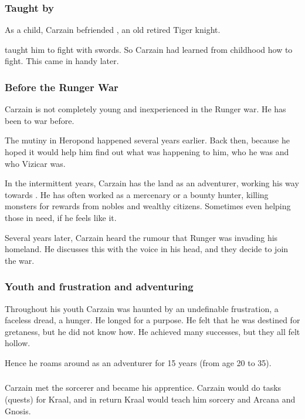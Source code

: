 \subsubsection[Taught by Weylon]{Taught by {\Weylon}}
As a child, Carzain befriended , an old retired Tiger knight. 

\Weylon{} taught him to fight with swords. 
So Carzain had learned from childhood how to fight. 
This came in handy later. 





\subsubsection{Before the Runger War}
Carzain is not completely young and inexperienced in the Runger war. 
He has been to war before. 

The mutiny in Heropond happened several years earlier. 
Back then,  because he hoped it would help him find out what was happening to him, who he was and who Vizicar was. 

In the intermittent years, Carzain has \travelled the land as an adventurer, working his way towards \kenosis. 
He has often worked as a mercenary or a bounty hunter, killing monsters for rewards from nobles and wealthy citizens. 
Sometimes even helping those in need, if he feels like it. 

Several years later, Carzain heard the rumour that Runger was invading his homeland. 
He discusses this with the voice in his head, and they decide to join the war. 





\subsubsection{Youth and frustration and adventuring}
Throughout his youth Carzain was haunted by an undefinable frustration, a faceless dread, a hunger. 
He longed for a purpose. 
He felt that he was destined for gretaness, but he did not know how.
He achieved many successes, but they all felt hollow. 

Hence he roams around as an adventurer for 15 years (from age 20 to 35). 





\subsubsection{\ZeethanKraal}
Carzain met the \caisith sorcerer  and became his apprentice.
Carzain would do tasks (quests) for Kraal, and in return Kraal would teach him sorcery and Arcana and Gnosis. 





